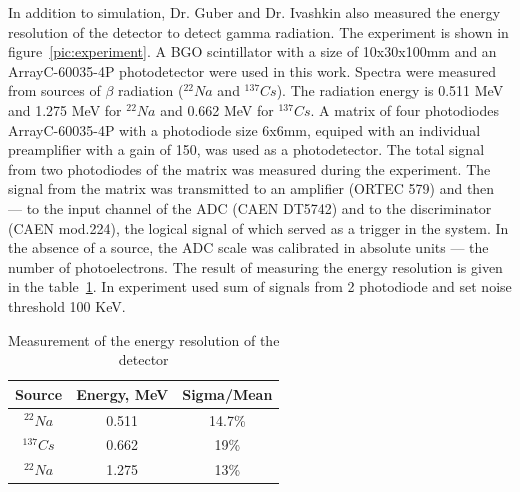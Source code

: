 \documentclass[a4paper]{panl}
\begin{document}
In addition to simulation, Dr. Guber and Dr. Ivashkin also measured the energy resolution of the detector to detect gamma radiation. The experiment is shown in figure~\ref{pic:experiment}. A BGO scintillator with a size of 10x30x100mm and an ArrayC-60035-4P photodetector were used in this work. Spectra were measured from sources of $\beta$ radiation ($^{22}Na$ and $^{137}Cs$). The radiation energy is 0.511 MeV and 1.275 MeV for $^{22}Na$ and 0.662 MeV for $^{137}Cs$. A matrix of four photodiodes ArrayC-60035-4P with a photodiode size 6x6mm, equiped with an individual preamplifier with a gain of 150, was used as a photodetector. The total signal from two photodiodes of the matrix was measured during the experiment. The signal from the matrix was transmitted to an amplifier (ORTEC 579) and then --- to the input channel of the ADC (CAEN DT5742) and to the discriminator (CAEN mod.224), the logical signal of which served as a trigger in the system. In the absence of a source, the ADC scale was calibrated in absolute units --- the number of photoelectrons. The result of measuring the energy resolution is given in the table~\ref{tab:ex}. In experiment used sum of signals from 2 photodiode and set noise threshold 100 KeV.\\
\begin{table}
    \caption{Measurement of the energy resolution of the detector}
    \label{tab:ex}
    \begin{center} 
        \begin{tabular}[c]{|c|c|c|}
            \hline 
            Source & Energy, MeV & Sigma/Mean \\
            \hline 
            $^{22}Na$&0.511 & 14.7\%  \\ 
            \hline 
            $^{137}Cs$&0.662 & 19\%\\ 
            \hline 
            $^{22}Na$& 1.275 & 13\% \\
            \hline 
        \end{tabular} 
    \end{center}
\end{table}
\end{document}
